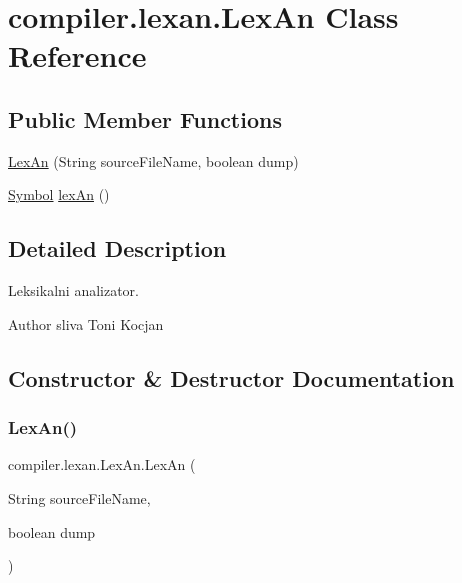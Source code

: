 \hypertarget{classcompiler_1_1lexan_1_1_lex_an}{}\section{compiler.\+lexan.\+Lex\+An Class Reference}
\label{classcompiler_1_1lexan_1_1_lex_an}
\subsection*{Public Member Functions}
\begin{DoxyCompactItemize}
\item 
\hyperlink{classcompiler_1_1lexan_1_1_lex_an_a715e897f47540346ad5801adc65b2337}{Lex\+An} (String source\+File\+Name, boolean dump)
\item 
\hyperlink{classcompiler_1_1lexan_1_1_symbol}{Symbol} \hyperlink{classcompiler_1_1lexan_1_1_lex_an_a60948e843ca8cdf9d6c9b28c5aa8193e}{lex\+An} ()
\end{DoxyCompactItemize}


\subsection{Detailed Description}
Leksikalni analizator.

\begin{DoxyAuthor}{Author}
sliva  Toni Kocjan 
\end{DoxyAuthor}


\subsection{Constructor \& Destructor Documentation}
\mbox{\label{classcompiler_1_1lexan_1_1_lex_an_a715e897f47540346ad5801adc65b2337}} 
\subsubsection{\texorpdfstring{Lex\+An()}{LexAn()}}
{\footnotesize\ttfamily compiler.\+lexan.\+Lex\+An.\+Lex\+An (\begin{DoxyParamCaption}\item[{String}]{source\+File\+Name,  }\item[{boolean}]{dump }\end{DoxyParamCaption})}






